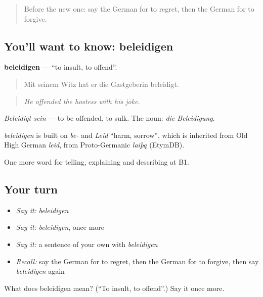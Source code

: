 \begin{quote}
Before the new one: say the German for to regret, then the German for to forgive.
\end{quote}

\subsection*{You'll want to know: beleidigen}
\textbf{beleidigen} — \textquotedblleft{}to insult, to offend\textquotedblright{}.

\begin{quote}
Mit seinem Witz hat er die Gastgeberin beleidigt.
\end{quote}

\begin{quote}
\emph{He offended the hostess with his joke.}
\end{quote}

\emph{Beleidigt sein} — to be offended, to sulk. The noun: \emph{die Beleidigung}.

\begin{cousinweb}
\emph{beleidigen} is built on \emph{be-} and \emph{Leid} \textquotedblleft{}harm, sorrow\textquotedblright{}, which is inherited from Old High German \emph{leid}, from Proto-Germanic \emph{laiþą} (EtymDB).
\end{cousinweb}

\begin{grammarlens}[title={What you've built}]
One more word for telling, explaining and describing at B1.
\end{grammarlens}

\subsection*{Your turn}
\begin{itemize}
\raggedright
  \item \emph{Say it:} \emph{beleidigen}
  \item \emph{Say it:} \emph{beleidigen}, once more
  \item \emph{Say it:} a sentence of your own with \emph{beleidigen}
  \item \emph{Recall:} say the German for to regret, then the German for to forgive, then say \emph{beleidigen} again
\end{itemize}

\begin{tcolorbox}[breakable,colback=teal!4,colframe=teal!35!black,title={Before you move on}]
What does beleidigen mean? (\textquotedblleft{}To insult, to offend\textquotedblright{}.) Say it once more.
\end{tcolorbox}

